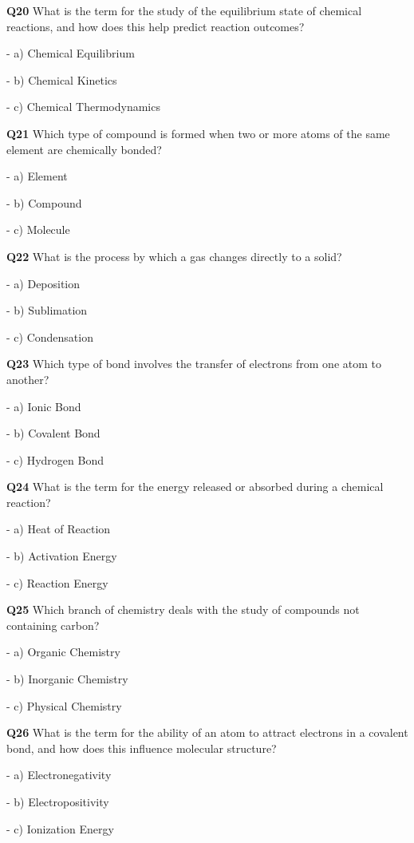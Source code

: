 \textbf{Q20} What is the term for the study of the equilibrium state of chemical reactions, and how does this help predict reaction outcomes?\par
\quad - a) Chemical Equilibrium\par
\quad - b) Chemical Kinetics\par
\quad - c) Chemical Thermodynamics\par

\textbf{Q21} Which type of compound is formed when two or more atoms of the same element are chemically bonded?\par
\quad - a) Element\par
\quad - b) Compound\par
\quad - c) Molecule\par

\textbf{Q22} What is the process by which a gas changes directly to a solid?\par
\quad - a) Deposition\par
\quad - b) Sublimation\par
\quad - c) Condensation\par

\textbf{Q23} Which type of bond involves the transfer of electrons from one atom to another?\par
\quad - a) Ionic Bond\par
\quad - b) Covalent Bond\par
\quad - c) Hydrogen Bond\par

\textbf{Q24} What is the term for the energy released or absorbed during a chemical reaction?\par
\quad - a) Heat of Reaction\par
\quad - b) Activation Energy\par
\quad - c) Reaction Energy\par

\textbf{Q25} Which branch of chemistry deals with the study of compounds not containing carbon?\par
\quad - a) Organic Chemistry\par
\quad - b) Inorganic Chemistry\par
\quad - c) Physical Chemistry\par

\textbf{Q26} What is the term for the ability of an atom to attract electrons in a covalent bond, and how does this influence molecular structure?\par
\quad - a) Electronegativity\par
\quad - b) Electropositivity\par
\quad - c) Ionization Energy\par

